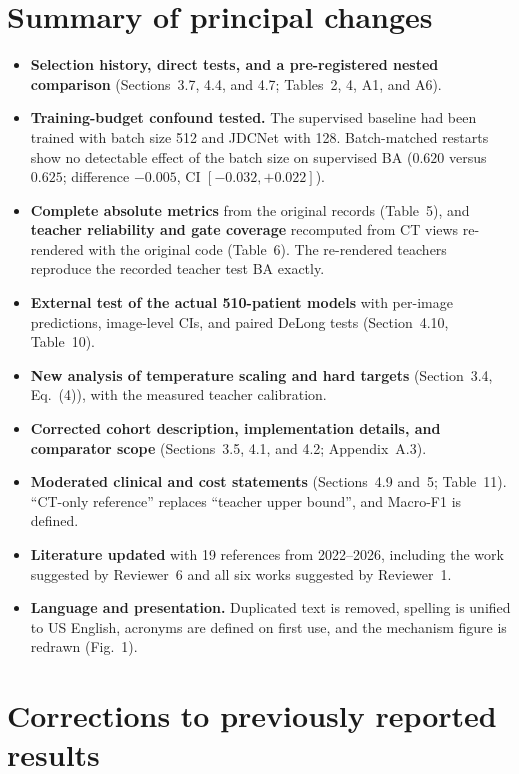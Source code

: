 \documentclass[11pt]{article}
\begin{document}
\hrulefill

\section*{Summary of principal changes}

\begin{itemize}[leftmargin=1.4em]
  \item \textbf{Selection history, direct tests, and a pre-registered nested comparison} (Sections~3.7, 4.4, and 4.7; Tables~2, 4, A1, and A6).
  \item \textbf{Training-budget confound tested.} The supervised baseline had been trained with batch size 512 and JDCNet with 128. Batch-matched restarts show no detectable effect of the batch size on supervised BA ($0.620$ versus $0.625$; difference $-0.005$, CI $[-0.032,+0.022]$).
  \item \textbf{Complete absolute metrics} from the original records (Table~5), and \textbf{teacher reliability and gate coverage} recomputed from CT views re-rendered with the original code (Table~6). The re-rendered teachers reproduce the recorded teacher test BA exactly.
  \item \textbf{External test of the actual 510-patient models} with per-image predictions, image-level CIs, and paired DeLong tests (Section~4.10, Table~10).
  \item \textbf{New analysis of temperature scaling and hard targets} (Section~3.4, Eq.~(4)), with the measured teacher calibration.
  \item \textbf{Corrected cohort description, implementation details, and comparator scope} (Sections~3.5, 4.1, and 4.2; Appendix~A.3).
  \item \textbf{Moderated clinical and cost statements} (Sections~4.9 and~5; Table~11). ``CT-only reference'' replaces ``teacher upper bound'', and Macro-F1 is defined.
  \item \textbf{Literature updated} with 19 references from 2022--2026, including the work suggested by Reviewer~6 and all six works suggested by Reviewer~1.
  \item \textbf{Language and presentation.} Duplicated text is removed, spelling is unified to US English, acronyms are defined on first use, and the mechanism figure is redrawn (Fig.~1).
\end{itemize}

\hrulefill

\section{Corrections to previously reported results}
\label{sec:corrections}
\end{document}
